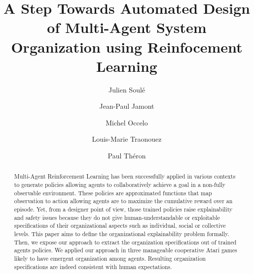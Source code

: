 \documentclass[runningheads]{llncs}
\begin{document}
%
\title{A Step Towards Automated Design of Multi-Agent System Organization using Reinfocement Learning}
%
%
\author{Julien Soulé \and
Jean-Paul Jamont \and
Michel Occelo \and
Louis-Marie Traonouez \and
Paul Théron}
%
%
%
\maketitle              %
%
\begin{abstract}

     Multi-Agent Reinforcement Learning has been successfully applied in various contexts to generate policies allowing agents to collaboratively achieve a goal in a non-fully observable environment. These policies are approximated functions that map observation to action allowing agents are to maximize the cumulative reward over an episode.
     Yet, from a designer point of view, those trained policies raise explainability and safety issues because they do not give human-understandable or exploitable specifications of their organizational aspects such as individual, social or collective levels.
     This paper aims to define the organizational explainability problem formally. Then, we expose our approach to extract the organization specifications out of trained agents policies.
     We applied our approach in three manageable cooperative Atari games likely to have emergent organization among agents. Resulting organization specifications are indeed consistent with human expectations.

\end{abstract}
\end{document}
